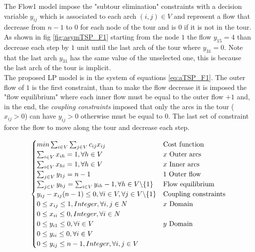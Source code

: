 The Flow1 model impose the "subtour elimination" constraints with a decision variable $ y_{ij} $ which is associated to each arch $ (i,j) \in V $ and represent a flow that decrease from $ n-1 $ to $ 0 $ for each node of the tour and is $ 0 $ if it is not in the tour. As shown in fig \ref{fig:asymTSP_F1} starting from the node $ 1 $ the flow $ y_{15} = 4 $ than decrease each step by $ 1 $ unit until the last arch of the tour where $ y_{31} = 0 $. Note that the last arch $ y_{31} $ has the same value of the unselected one, this is because the last arch of the tour is implicit. \\
The proposed LP model is in the system of equations \ref{eq:aTSP_F1}. The outer flow of $ 1 $ is the first constraint, than to make the flow decrease it is imposed the "flow equilibrium" where each inner flow must be equal to the outer flow $ +1 $ and, in the end, the \textit{coupling constraints} imposed that only the arcs in the tour ($ x_{ij} > 0 $) can have $ y_{ij} > 0 $ otherwise must be equal to $ 0 $. The last set of constraint force the flow to move along the tour and decrease each step. 

\begin{equation}
\begin{cases}
min \sum_{i\in V}\sum_{j\in V} c_{ij}x_{ij}  & \text{Cost function} \\
\sum_{i\in V} x_{ih} = 1, \forall h \in V  & \text{$ x $ Outer arcs} \\
\sum_{i\in V} x_{hi} = 1, \forall h \in V  & \text{$ x $ Inner arcs} \\
\sum_{j\in V} y_{1j} = n-1  & \text{$ 1 $ Outer flow} \\
\sum_{j\in V} y_{hj} = \sum_{i \in V}y_{ih} - 1, \forall h \in V \backslash \{1\}  & \text{Flow equilibrium} \\
y_{ij} - x_{ij}(n-1) \le 0, \forall i \in V, \forall j \in V \backslash \{1\}  & \text{Coupling constraints} \\
0 \le x_{ij} \le 1, Integer, \forall i,j \in N  & \text{$ x $ Domain} \\
0 \le x_{ii} \le 0, Integer, \forall i \in N & \text{} \\
0 \le y_{i1} \le 0, \forall i \in V  & \text{$ y $ Domain} \\
0 \le y_{ii} \le 0, \forall i \in V  & \text{} \\
0 \le y_{ij} \le n-1, Integer, \forall i,j \in V  & \text{} 
\end{cases}
\label{eq:aTSP_F1}
\end{equation}



